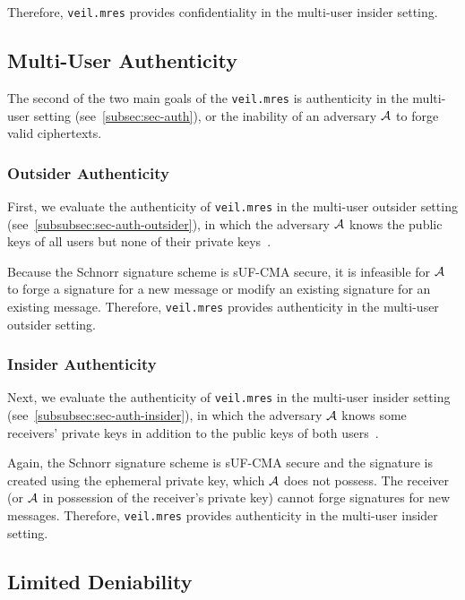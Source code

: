 Therefore, \texttt{veil.mres} provides confidentiality in the multi-user insider setting.

\subsection{Multi-User Authenticity}\label{subsec:veil.mres-auth}

The second of the two main goals of the \texttt{veil.mres} is authenticity in the multi-user setting
(see~\ref{subsec:sec-auth}), or the inability of an adversary $\mathcal{A}$ to forge valid ciphertexts.

\subsubsection{Outsider Authenticity}

First, we evaluate the authenticity of \texttt{veil.mres} in the multi-user outsider setting
(see~\ref{subsubsec:sec-auth-outsider}), in which the adversary $\mathcal{A}$ knows the public keys of all users but none
of their private keys~\cite[p. 47]{baek2010}.

Because the Schnorr signature scheme is sUF-CMA secure, it is infeasible for $\mathcal{A}$ to forge a signature for a new
message or modify an existing signature for an existing message.
Therefore, \texttt{veil.mres} provides authenticity in the multi-user outsider setting.

\subsubsection{Insider Authenticity}

Next, we evaluate the authenticity of \texttt{veil.mres} in the multi-user insider setting
(see~\ref{subsubsec:sec-auth-insider}), in which the adversary $\mathcal{A}$ knows some receivers' private keys in
addition to the public keys of both users~\cite[p. 48]{baek2010}.

Again, the Schnorr signature scheme is sUF-CMA secure and the signature is created using the ephemeral private key,
which $\mathcal{A}$ does not possess.
The receiver (or $\mathcal{A}$ in possession of the receiver's private key) cannot forge signatures for new messages.
Therefore, \texttt{veil.mres} provides authenticity in the multi-user insider setting.

\subsection{Limited Deniability}\label{subsec:veil.mres-deniability}

